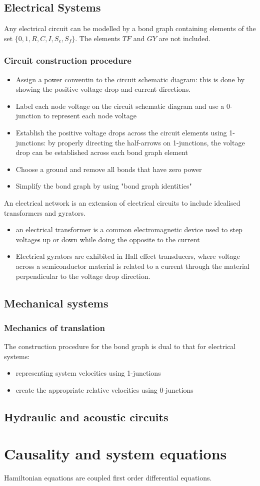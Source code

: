 \documentclass{book}
\begin{document}
\section{Electrical Systems}
Any electrical circuit can be modelled by a bond graph containing elements of the set $\{0,1,R,C,I,S_e,S_f\}$. The elements $TF$ and $GY$ are not included. 
\subsection{Circuit construction procedure}
\begin{itemize}
    \item Assign a power conventin to the circuit schematic diagram: this is done by showing the positive voltage drop and current directions.
    \item Label each node voltage on the circuit schematic diagram and use a 0-junction to represent each node voltage 
    \item Establish the positive voltage drops across the circuit elements using 1-junctions: by properly directing the half-arrows on 1-junctions, the voltage drop can be established across each bond graph element
    \item Choose a ground and remove all bonds that have zero power
    \item Simplify the bond graph by using "bond graph identities"
\end{itemize}
An electrical network is an extension of electrical circuits to include idealised transformers and gyrators.
\begin{itemize}
    \item an electrical transformer is a common electromagnetic device used to step voltages up or down while doing the opposite to the current 
    \item Electrical gyrators are exhibited in Hall effect transducers, where voltage across a semiconductor material is related to a current through the material perpendicular to the voltage drop direction.
\end{itemize}

\section{Mechanical systems}
\subsection{Mechanics of translation}
The construction procedure for the bond graph is dual to that for electrical systems: 
\begin{itemize}
    \item representing system velocities using 1-junctions
    \item create the appropriate relative velocities using 0-junctions
\end{itemize}



\section{Hydraulic and acoustic circuits}





\chapter{Causality and system equations}
Hamiltonian equations are coupled first order differential equations. 
\end{document}
